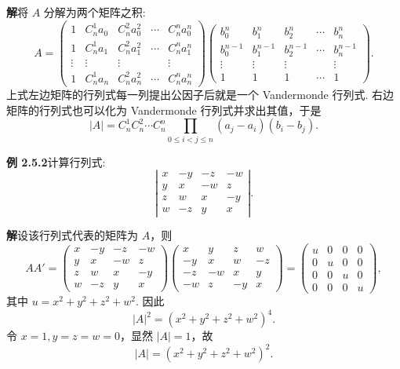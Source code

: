 \documentclass[UTF8,12pt,a4paper,fontset=fandol]{ctexart}
\begin{document}
\noindent\textbf{解}\quad 将 $A$ 分解为两个矩阵之积:
\[
A=
\left(\begin{array}{ccccc}
1 & C_n^1a_0 & C_n^2a_0^2 & \cdots & C_n^na_0^n\\
1 & C_n^1a_1 & C_n^2a_1^2 & \cdots & C_n^na_1^n\\
\vdots & \vdots & \vdots & & \vdots\\
1 & C_n^1a_n & C_n^2a_n^2 & \cdots & C_n^na_n^n
\end{array}\right)
\left(\begin{array}{ccccc}
b_0^n & b_1^n & b_2^n & \cdots & b_n^n\\
b_0^{n-1} & b_1^{n-1} & b_2^{n-1} & \cdots & b_n^{n-1}\\
\vdots & \vdots & \vdots & & \vdots\\
1 & 1 & 1 & \cdots & 1
\end{array}\right).
\]
上式左边矩阵的行列式每一列提出公因子后就是一个 Vandermonde 行列式. 右边矩阵的行列式也可以化为 Vandermonde 行列式并求出其值，于是
\[
|A|=C_n^1C_n^2\cdots C_n^n\prod_{0\le i<j\le n}(a_j-a_i)(b_i-b_j).
\]

\noindent\textbf{例 2.5.2}\quad 计算行列式:
\[
\left|\begin{array}{rrrr}
x & -y & -z & -w\\
y & x & -w & z\\
z & w & x & -y\\
w & -z & y & x
\end{array}\right|.
\]

\noindent\textbf{解}\quad 设该行列式代表的矩阵为 $A$，则
\[
AA'=
\left(\begin{array}{rrrr}
x & -y & -z & -w\\
y & x & -w & z\\
z & w & x & -y\\
w & -z & y & x
\end{array}\right)
\left(\begin{array}{rrrr}
x & y & z & w\\
-y & x & w & -z\\
-z & -w & x & y\\
-w & z & -y & x
\end{array}\right)
=
\left(\begin{array}{cccc}
u & 0 & 0 & 0\\
0 & u & 0 & 0\\
0 & 0 & u & 0\\
0 & 0 & 0 & u
\end{array}\right),
\]
其中 $u=x^2+y^2+z^2+w^2$. 因此
\[
|A|^2=(x^2+y^2+z^2+w^2)^4.
\]
令 $x=1,y=z=w=0$，显然 $|A|=1$，故
\[
|A|=(x^2+y^2+z^2+w^2)^2.
\]
\end{document}
